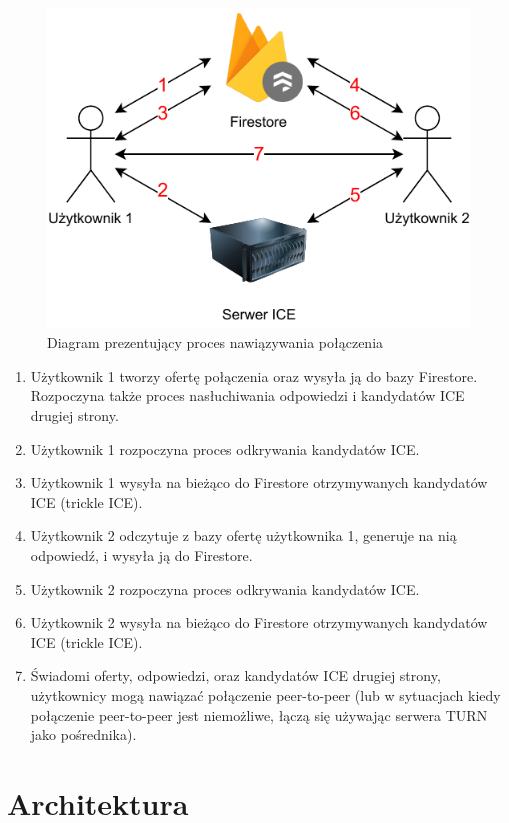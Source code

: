 \begin{figure}[H]
  \centering
  \includegraphics{img/webrtc-connection-init}
  \caption{Diagram prezentujący proces nawiązywania połączenia}
  \label{fig:webrtc_connection_init}
\end{figure}

\begin{enumerate}
  \item Użytkownik 1 tworzy ofertę połączenia oraz wysyła ją do bazy Firestore. Rozpoczyna także proces nasłuchiwania
        odpowiedzi i kandydatów ICE drugiej strony.
  \item Użytkownik 1 rozpoczyna proces odkrywania kandydatów ICE.
  \item Użytkownik 1 wysyła na bieżąco do Firestore otrzymywanych kandydatów ICE (trickle ICE).
  \item Użytkownik 2 odczytuje z bazy ofertę użytkownika 1, generuje na nią odpowiedź, i wysyła ją do Firestore.
  \item Użytkownik 2 rozpoczyna proces odkrywania kandydatów ICE.
  \item Użytkownik 2 wysyła na bieżąco do Firestore otrzymywanych kandydatów ICE (trickle ICE).
  \item Świadomi oferty, odpowiedzi, oraz kandydatów ICE drugiej strony, użytkownicy mogą nawiązać połączenie
        peer-to-peer (lub w sytuacjach kiedy połączenie peer-to-peer jest niemożliwe, łączą się używając serwera TURN
        jako pośrednika).
        
\end{enumerate}

\section{Architektura}

